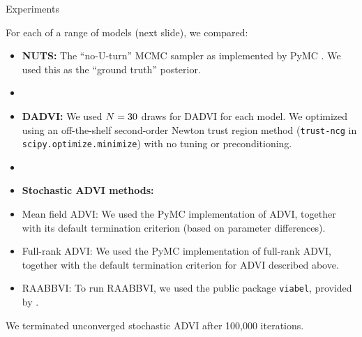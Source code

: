 \documentclass[8pt]{beamer}\usepackage[]{graphicx}\usepackage[]{color}
\begin{document}
\begin{frame}{Experiments}

For each of a range of models (next slide), we compared:

\begin{itemize}
    \item \textbf{NUTS:} The ``no-U-turn'' MCMC sampler as implemented by PyMC
    \citep{salvatier:2016:pymc3}.  We used this as the ``ground truth''
    posterior.
    \item[]
    \item \textbf{DADVI:}  We used $N=30$ draws for DADVI for
    each model. We optimized using an off-the-shelf second-order Newton trust region
    method (\texttt{trust-ncg} in \texttt{scipy.optimize.minimize}) with no
    tuning or preconditioning.
    \item[]
    \item[]\textbf{Stochastic ADVI methods:}
    \item Mean field ADVI: We used the PyMC implementation of
    ADVI, together with its default termination criterion (based on parameter
    differences). 
    \item Full-rank ADVI: We used the PyMC implementation of
    full-rank ADVI, together with the default termination criterion for ADVI
    described above.
    \item RAABBVI: To run RAABBVI, we used the public package
    \texttt{viabel}, provided
    by \citet{welandawe:2022:robustbbvi}.
    \end{itemize}

We terminated unconverged stochastic ADVI after 100,000 iterations.
    

\end{frame}


\end{document}
